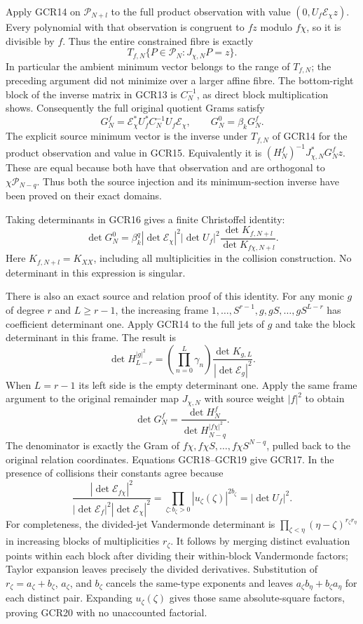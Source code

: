 \documentclass[11pt,a4paper]{article}
\begin{document}
Apply GCR14 on $\mathcal P_{N+l}$ to the full product observation
with value $(0,U_f\mathcal E_\chi z)$. Every polynomial with
that observation is congruent to $fz$ modulo $f\chi$, so it is
divisible by $f$. Thus the entire constrained fibre is exactly
\[
 T_{f,N}\{P\in\mathcal P_N:J_{\chi,N}P=z\}.
\tag{GCR15}
\]
In particular the ambient minimum vector belongs to the range
of $T_{f,N}$; the preceding argument did not minimize over a
larger affine fibre. The bottom-right block of the inverse
matrix in GCR13 is $C_N^{-1}$, as direct block multiplication
shows. Consequently the full original quotient Grams satisfy
\[
 \boxed{\quad
 G_N^f=\mathcal E_\chi^*U_f^*C_N^{-1}U_f\mathcal E_\chi,
 \qquad G_N^0=\beta_k G_N^f.
 \quad}\tag{GCR16}
\]
The explicit source minimum vector is the inverse under $T_{f,N}$
of GCR14 for the product observation and value in GCR15.
Equivalently it is
$(H_N^f)^{-1}J_{\chi,N}^*G_N^f z$. These are equal because both
have that observation and are orthogonal to
$\chi\mathcal P_{N-q}$. Thus both the source injection and its
minimum-section inverse have been proved on their exact domains.

Taking determinants in GCR16 gives a finite Christoffel identity:
\[
 \det G_N^0
 =\beta_k^q|\det\mathcal E_\chi|^2|\det U_f|^2
                  \frac{\det K_{f,N+l}}{\det K_{f\chi,N+l}}.
\tag{GCR17}
\]
Here $K_{f,N+l}=K_{XX}$, including all multiplicities in the
collision construction. No determinant in this expression is
singular.

There is also an exact source and relation proof of this identity.
For any monic $g$ of degree $r$ and $L\geq r-1$, the increasing
frame
$1,\ldots,S^{r-1},g,gS,\ldots,gS^{L-r}$
has coefficient determinant one. Apply GCR14 to the full jets
of $g$ and take the block determinant in this frame. The result is
\[
 \det H^{|g|^2}_{L-r}
   =\left(\prod_{n=0}^L\gamma_n\right)
           \frac{\det K_{g,L}}{|\det\mathcal E_g|^2}.
\tag{GCR18}
\]
When $L=r-1$ its left side is the empty determinant one.
Apply the same frame argument to the original remainder map
$J_{\chi,N}$ with source weight $|f|^2$ to obtain
\[
 \det G_N^f
   =\frac{\det H^f_N}{\det H^{|f\chi|^2}_{N-q}}.
\tag{GCR19}
\]
The denominator is exactly the Gram of
$f\chi,f\chi S,\ldots,f\chi S^{N-q}$, pulled back to the
original relation coordinates. Equations GCR18--GCR19 give
GCR17. In the presence of collisions their constants agree
because
\[
 \frac{|\det\mathcal E_{f\chi}|^2}
      {|\det\mathcal E_f|^2|\det\mathcal E_\chi|^2}
       =\prod_{\zeta:b_\zeta>0}|u_\zeta(\zeta)|^{2b_\zeta}
       =|\det U_f|^2.
\tag{GCR20}
\]
For completeness, the divided-jet Vandermonde determinant is
$\prod_{\zeta<\eta}(\eta-\zeta)^{r_\zeta r_\eta}$
in increasing blocks of multiplicities $r_\zeta$.
It follows by merging distinct evaluation points within each
block after dividing their within-block Vandermonde factors;
Taylor expansion leaves precisely the divided derivatives.
Substitution of $r_\zeta=a_\zeta+b_\zeta$, $a_\zeta$, and
$b_\zeta$ cancels the same-type exponents and leaves
$a_\zeta b_\eta+b_\zeta a_\eta$ for each distinct pair.
Expanding $u_\zeta(\zeta)$ gives those same absolute-square
factors, proving GCR20 with no unaccounted factorial.
\end{document}
